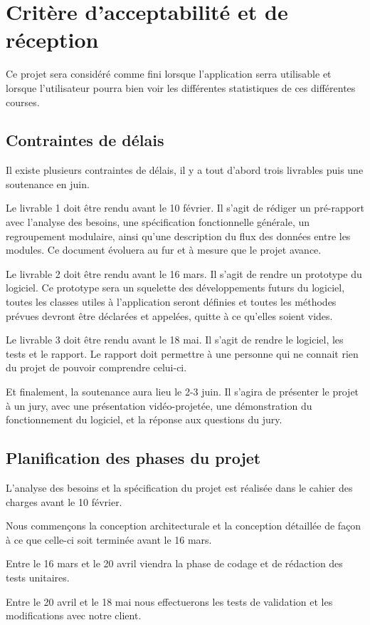 \chapter{Critère d’acceptabilité et de réception}

Ce projet sera considéré comme fini lorsque l’application serra utilisable et lorsque l’utilisateur pourra bien voir les différentes statistiques de ces différentes courses.

\section{Contraintes de délais}

Il existe plusieurs contraintes de délais, il y a tout d'abord trois livrables puis une soutenance en juin.

Le livrable 1 doit être rendu avant le 10 février. Il s'agit de rédiger un pré-rapport avec l'analyse des besoins, une spécification fonctionnelle générale, un regroupement modulaire, ainsi qu'une description du flux des données entre les modules. Ce document évoluera au fur et à mesure que le projet avance.

Le livrable 2 doit être rendu avant le 16 mars. Il s'agit de rendre un prototype du logiciel. Ce prototype sera un squelette des développements futurs du logiciel, toutes les classes utiles à l'application seront définies et toutes les méthodes prévues devront être déclarées et appelées, quitte à ce qu'elles soient vides.

Le livrable 3 doit être rendu avant le 18 mai. Il s'agit de rendre le logiciel, les tests et le rapport. Le rapport doit permettre à une personne qui ne connait rien du projet de pouvoir comprendre celui-ci.

Et finalement, la soutenance aura lieu le 2-3 juin. Il s'agira de présenter le projet à un jury, avec une présentation vidéo-projetée, une démonstration du fonctionnement du logiciel, et la réponse aux questions du jury.

\section{Planification des phases du projet}

L'analyse des besoins et la spécification du projet est réalisée dans le cahier des charges avant le 10 février.

Nous commençons la conception architecturale et la conception détaillée de façon à ce que celle-ci soit terminée avant le 16 mars.

Entre le 16 mars et le 20 avril viendra la phase de codage et de rédaction des tests unitaires.

Entre le 20 avril et le 18 mai nous effectuerons les tests de validation et les modifications avec notre client.